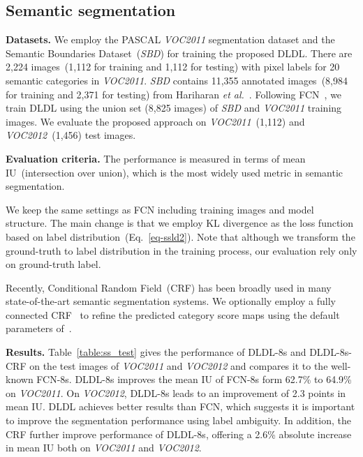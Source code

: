 \documentclass[journal]{IEEEtran}
\begin{document}
\subsection{Semantic segmentation}




\textbf{Datasets.} We employ the PASCAL \emph{VOC2011} segmentation dataset and the Semantic Boundaries Dataset~(\emph{SBD}) for training the proposed DLDL. There are 2,224 images~(1,112 for training and 1,112 for testing) with pixel labels for 20 semantic categories in \emph{VOC2011}. \emph{SBD} contains 11,355 annotated images~(8,984 for training and 2,371 for testing) from Hariharan \emph{et al.}~\cite{hariharan2011semantic}. Following FCN~\cite{long2015fully}, we train DLDL using the union set (8,825 images) of \emph{SBD} and \emph{VOC2011} training images. We evaluate the proposed approach on \emph{VOC2011}~(1,112) and \emph{VOC2012}~(1,456) test images.

\textbf{Evaluation criteria.} The performance is measured in terms of mean IU~(intersection over union), which is the most widely used metric in semantic segmentation.

We keep the same settings as FCN including training images and model structure. The main change is that we employ KL divergence as the loss function based on label distribution~(Eq.~\ref{eq-ssld2}). Note that although we transform the ground-truth to label distribution in the training process, our evaluation rely only on ground-truth label.

Recently, Conditional Random Field~(CRF) has been broadly used in many state-of-the-art semantic segmentation systems. We optionally employ a fully connected CRF~\cite{KrahenbuhlK11} to refine the predicted category score maps using the default parameters of~\cite{CP2015Semantic}.

\textbf{Results.} Table~\ref{table:ss_test} gives the performance of DLDL-8s and DLDL-8s-CRF on the test images of \emph{VOC2011} and \emph{VOC2012} and compares it to the well-known FCN-8s. DLDL-8s improves the mean IU of FCN-8s form 62.7\% to 64.9\% on \emph{VOC2011}. On \emph{VOC2012}, DLDL-8s leads to an improvement of 2.3 points in mean IU.  DLDL achieves better results than FCN, which suggests it is important to improve the segmentation performance using label ambiguity. In addition, the CRF further improve performance of DLDL-8s, offering a 2.6\% absolute increase in mean IU both on \emph{VOC2011} and \emph{VOC2012}.
\end{document}
